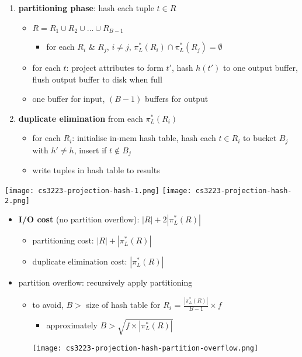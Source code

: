 \documentclass[10pt, landscape]{article}
\begin{document}
\begin{multicols*}{4}
  \begin{enumerate}
    \item \textbf{partitioning phase}: hash each tuple $t \in R$
          \begin{itemize}
            \item $R = R_1 \cup R_2 \cup \dots \cup R_{B-1}$
                  \begin{itemize}
                    \item for each $R_i$ \& $R_j$, $i \neq j$, $\pi_L^*(R_i) \cap \pi_L^*(R_j) = \emptyset$
                  \end{itemize}
            \item for each $t$: project attributes to form $t'$, hash $h(t')$ to one output buffer, flush output buffer to disk when full
            \item one buffer for input, $(B-1)$ buffers for output
          \end{itemize}
    \item \textbf{duplicate elimination} from each $\pi^*_L(R_i)$
          \begin{itemize}
            \item for each $R_i$: initialise in-mem hash table, hash each $t \in R_i$ to bucket $B_j$ with $h' \neq h$, insert if $t \not\in B_j$
            \item write tuples in hash table to results
          \end{itemize}
  \end{enumerate}
  \texttt{[image: cs3223-projection-hash-1.png]}
  \texttt{[image: cs3223-projection-hash-2.png]}

  \begin{itemize}
    \item \textbf{I/O cost} (no partition overflow): $|R| + 2|\pi^*_L(R)|$
          \begin{itemize}
            \item partitioning cost: $|R| + |\pi^*_L(R)|$
            \item duplicate elimination cost: $|\pi^*_L(R)|$
          \end{itemize}
    \item partition overflow: recursively apply partitioning
          \begin{itemize}
            \item to avoid, $B>$ size of hash table for $R_i$ = $\frac{|\pi^*_L(R)|}{B-1} \times f$
                  \begin{itemize}
                    \item  approximately $B> \sqrt{f\times |\pi^*_L(R)|}$
                  \end{itemize}
                  \texttt{[image: cs3223-projection-hash-partition-overflow.png]}
          \end{itemize}
  \end{itemize}


\end{multicols*}
\end{document}
